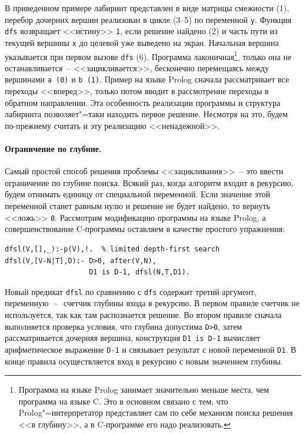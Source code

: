 \documentclass[a4paper,14pt, openany, twoside, final]{extbook} %
\begin{document}
В приведенном примере лабиринт представлен в виде матрицы смежности (1), перебор дочерних вершин реализован в цикле (3--5) по переменной \texttt{y}.  Функция \texttt{dfs} возвращает <<истину>> \texttt{1}, если решение найдено (2) и часть пути из текущей вершины \texttt{x} до целевой уже выведено на экран.  Начальная вершина указывается при первом вызове \texttt{dfs} (6).  Программа лаконичная\footnote{Программа на языке Prolog занимает значительно меньше места, чем программа на языке C.  Это в основном связано с тем, что Prolog"=интерпретатор представляет сам по себе механизм поиска решения <<в глубину>>, а в C-программе его надо реализовать.}, только она не останавливается~-- <<зацикливается>>, бесконечно перемещаясь между вершинами \texttt{a~(0)} и \texttt{b~(1)}.  Пример на языке \foreignlanguage{english}{Prolog} сначала рассматривает все переходы <<вперед>>, только потом вводит в рассмотрение переходы в обратном направлении.  Эта особенность реализации программы и структура лабиринта позволяет"=таки находить первое решение.  Несмотря на это, будем по-прежнему считать и эту реализацию <<ненадежной>>.

\paragraph{Ограничение по глубине.} Самый простой способ решения проблемы <<зацикливания>>~-- это ввести ограничение по глубине поиска.  Всякий раз, когда алгоритм входит в рекурсию, будем отнимать единицу от специальной переменной.  Если значение этой переменной станет равным нулю и решение не будет найдено, то вернуть <<ложь>> \texttt{0}.  Рассмотрим модификацию программы на языке Prolog, а совершенствование C-программы оставляем в качестве простого упражнения:

\begin{verbatim}
dfsl(V,[],_):-p(V),!.  % limited depth-first search
dfsl(V,[V-N|T],D):- D>0, after(V,N),
                    D1 is D-1, dfsl(N,T,D1).
\end{verbatim}


Новый предикат \texttt{dfsl} по сравнению с \texttt{dfs} содержит третий аргумент, переменную\,~--~\,счетчик глубины входа в рекурсию.  В первом правиле счетчик не используется, так как там распознается решение.  Во втором правиле сначала выполняется проверка условия, что глубина допустима \texttt{D>0}, затем рассматривается дочерняя вершина, конструкция \texttt{D1 is D-1} вычисляет арифметическое выражение \texttt{D-1} и связывает результат с новой переменной \texttt{D1}.  В конце правила осуществляется вход в рекурсию с новым значением глубины.
\end{document}
